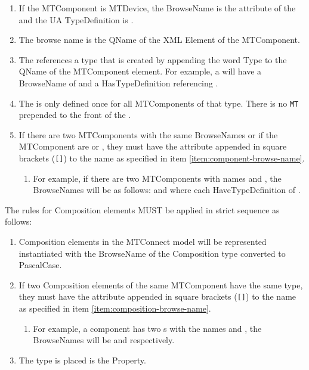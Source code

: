 \begin{enumerate}
  \item If the \gls{MTComponent} is \gls{MTDevice}, the \gls{BrowseName} is the  attribute of the  and the UA \gls{TypeDefinition} is .
  \item The browse name is the \gls{QName} of the XML Element of the \gls{MTComponent}. \label{item:component-browse-name}
  \item The  references a type that is created by appending the word \gls{Type} to the \gls{QName} of the \gls{MTComponent} element. For example, a  will have a \gls{BrowseName} of  and a \gls{HasTypeDefinition} referencing .
  \item The  is only defined once for all \glspl{MTComponent} of that type. There is no \texttt{MT} prepended to the front of the  .
  \item If there are two \glspl{MTComponent} with the same \glspl{BrowseName} or if the \gls{MTComponent} are  or , they must have the  attribute appended in square brackets (\texttt{[]}) to the name as specified in item \ref{item:component-browse-name}.
  \begin{enumerate}
    \item For example, if there are two  \glspl{MTComponent} with names  and , the \glspl{BrowseName} will be as follows:  and  where each \gls{HaveTypeDefinition} of .
  \end{enumerate}
\end{enumerate}

The rules for \gls{Composition} elements MUST be applied in strict sequence as follows: 

\begin{enumerate}
  \item  \gls{Composition} elements in the MTConnect model will be represented instantiated with the \gls{BrowseName} of the \gls{Composition} \gls{type} converted to \gls{PascalCase}. \label{item:composition-browse-name}
  \item If two \gls{Composition} elements of the same \gls{MTComponent} have the same \gls{type}, they must have the  attribute appended in square brackets (\texttt{[]}) to the name as specified in item \ref{item:composition-browse-name}.
  \begin{enumerate}
    \item For example, a component has two s with the names  and , the \glspl{BrowseName} will be  and  respectively.
  \end{enumerate}
  \item The type is placed is the  \gls{Property}.
\end{enumerate}

